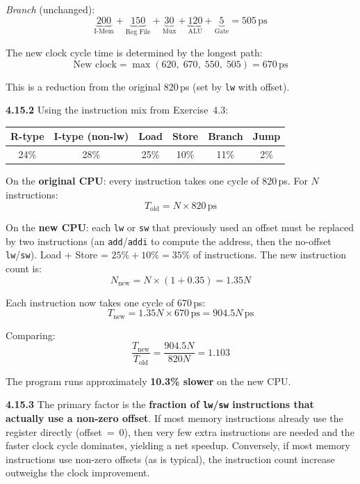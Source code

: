 \medskip\noindent\textit{Branch} (unchanged):
\[
  \underbrace{200}_{\text{I-Mem}} +
  \underbrace{150}_{\text{Reg File}} +
  \underbrace{30}_{\text{Mux}} +
  \underbrace{120}_{\text{ALU}} +
  \underbrace{5}_{\text{Gate}}
  = 505\,\text{ps}
\]

The new clock cycle time is determined by the longest path:
\[
  \text{New clock} = \max(620,\; 670,\; 550,\; 505) = \boxed{670\,\text{ps}}
\]

This is a reduction from the original 820\,ps (set by \texttt{lw} with offset).

\medskip\noindent\textbf{4.15.2}
Using the instruction mix from Exercise~4.3:

\begin{center}
\begin{tabular}{cccccc}
\toprule
\textbf{R-type} & \textbf{I-type (non-lw)} & \textbf{Load} &
\textbf{Store} & \textbf{Branch} & \textbf{Jump} \\
\midrule
24\% & 28\% & 25\% & 10\% & 11\% & 2\% \\
\bottomrule
\end{tabular}
\end{center}

On the \textbf{original CPU}: every instruction takes one cycle of 820\,ps.
For $N$ instructions:
\[
  T_{\text{old}} = N \times 820\,\text{ps}
\]

On the \textbf{new CPU}: each \texttt{lw} or \texttt{sw} that previously used
an offset must be replaced by two instructions (an \texttt{add}/\texttt{addi}
to compute the address, then the no-offset \texttt{lw}/\texttt{sw}). Load + Store
= $25\% + 10\% = 35\%$ of instructions. The new instruction count is:
\[
  N_{\text{new}} = N \times (1 + 0.35) = 1.35N
\]

Each instruction now takes one cycle of 670\,ps:
\[
  T_{\text{new}} = 1.35N \times 670\,\text{ps} = 904.5N\,\text{ps}
\]

Comparing:
\[
  \frac{T_{\text{new}}}{T_{\text{old}}}
  = \frac{904.5N}{820N}
  = 1.103
\]

The program runs approximately \textbf{10.3\% slower} on the new CPU.

\medskip\noindent\textbf{4.15.3}
The primary factor is the \textbf{fraction of \texttt{lw}/\texttt{sw}
instructions that actually use a non-zero offset}. If most memory instructions
already use the register directly (offset~=~0), then very few extra
instructions are needed and the faster clock cycle dominates, yielding a net
speedup. Conversely, if most memory instructions use non-zero offsets (as is
typical), the instruction count increase outweighs the clock improvement.


